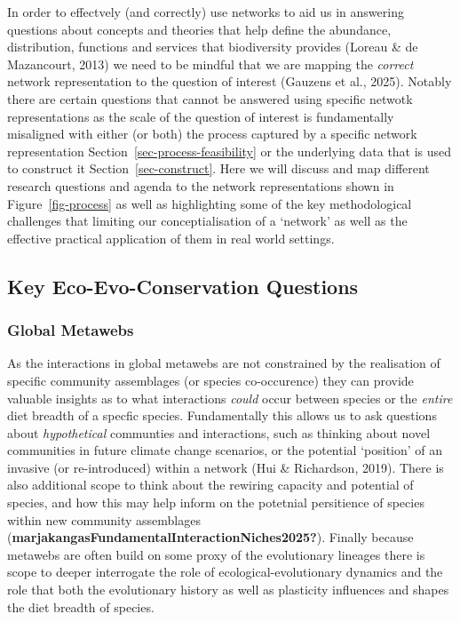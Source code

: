 \documentclass[
]{article}
\begin{document}
In order to effectvely (and correctly) use networks to aid us in
answering questions about concepts and theories that help define the
abundance, distribution, functions and services that biodiversity
provides (Loreau \& de Mazancourt, 2013) we need to be mindful that we
are mapping the \emph{correct} network representation to the question of
interest (Gauzens et al., 2025). Notably there are certain questions
that cannot be answered using specific netwotk representations as the
scale of the question of interest is fundamentally misaligned with
either (or both) the process captured by a specific network
representation Section~\ref{sec-process-feasibility} or the underlying
data that is used to construct it Section~\ref{sec-construct}. Here we
will discuss and map different research questions and agenda to the
network representations shown in Figure~\ref{fig-process} as well as
highlighting some of the key methodological challenges that limiting our
conceptialisation of a `network' as well as the effective practical
application of them in real world settings.

\subsection{Key Eco-Evo-Conservation
Questions}\label{key-eco-evo-conservation-questions}

\subsubsection{Global Metawebs}\label{global-metawebs}

As the interactions in global metawebs are not constrained by the
realisation of specific community assemblages (or species co-occurence)
they can provide valuable insights as to what interactions \emph{could}
occur between species or the \emph{entire} diet breadth of a specfic
species. Fundamentally this allows us to ask questions about
\emph{hypothetical} communties and interactions, such as thinking about
novel communities in future climate change scenarios, or the potential
`position' of an invasive (or re-introduced) within a network (Hui \&
Richardson, 2019). There is also additional scope to think about the
rewiring capacity and potential of species, and how this may help inform
on the potetnial persitience of species within new community assemblages
(\textbf{marjakangasFundamentalInteractionNiches2025?}). Finally because
metawebs are often build on some proxy of the evolutionary lineages
there is scope to deeper interrogate the role of ecological-evolutionary
dynamics and the role that both the evolutionary history as well as
plasticity influences and shapes the diet breadth of species.
\end{document}
